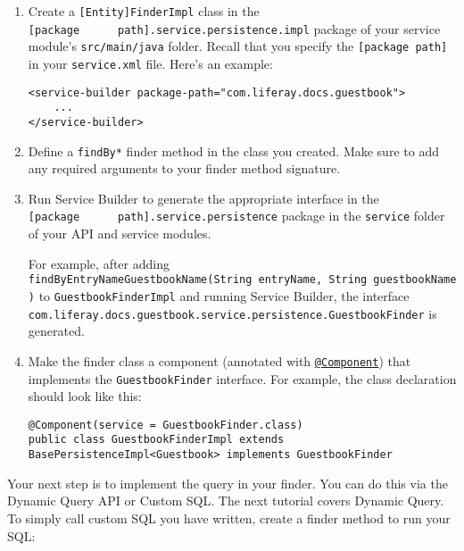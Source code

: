 \begin{enumerate}
\def\labelenumi{\arabic{enumi}.}
\item
  Create a \texttt{{[}Entity{]}FinderImpl} class in the
  \texttt{{[}package\ \ \ \ \ \ path{]}.service.persistence.impl}
  package of your service module's \texttt{src/main/java} folder. Recall
  that you specify the \texttt{{[}package\ path{]}} in your
  \texttt{service.xml} file. Here's an example:

\begin{verbatim}
<service-builder package-path="com.liferay.docs.guestbook">
    ...
</service-builder>
\end{verbatim}
\item
  Define a \texttt{findBy*} finder method in the class you created. Make
  sure to add any required arguments to your finder method signature.
\item
  Run Service Builder to generate the appropriate interface in the
  \texttt{{[}package\ \ \ \ \ \ path{]}.service.persistence} package in
  the \texttt{service} folder of your API and service modules.

  For example, after adding
  \texttt{findByEntryNameGuestbookName(String\ entryName,\ String\ guestbookName)}
  to \texttt{GuestbookFinderImpl} and running Service Builder, the
  interface
  \texttt{com.liferay.docs.guestbook.service.persistence.GuestbookFinder}
  is generated.
\item
  Make the finder class a component (annotated with
  \href{https://docs.osgi.org/javadoc/osgi.cmpn/7.0.0/org/osgi/service/component/annotations/Component.html}{\texttt{@Component}})
  that implements the \texttt{GuestbookFinder} interface. For example,
  the class declaration should look like this:

\begin{verbatim}
@Component(service = GuestbookFinder.class)
public class GuestbookFinderImpl extends BasePersistenceImpl<Guestbook> implements GuestbookFinder
\end{verbatim}
\end{enumerate}

Your next step is to implement the query in your finder. You can do this
via the Dynamic Query API or Custom SQL. The next tutorial covers
Dynamic Query. To simply call custom SQL you have written, create a
finder method to run your SQL:

